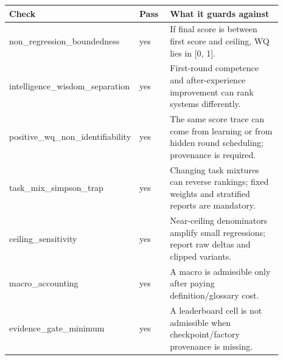 \begin{tabular}{p{0.27\linewidth}p{0.12\linewidth}p{0.50\linewidth}}
\toprule
Check & Pass & What it guards against \\
\midrule
non\_regression\_boundedness & yes & If final score is between first score and ceiling, WQ lies in [0, 1]. \\
intelligence\_wisdom\_separation & yes & First-round competence and after-experience improvement can rank systems differently. \\
positive\_wq\_non\_identifiability & yes & The same score trace can come from learning or from hidden round scheduling; provenance is required. \\
task\_mix\_simpson\_trap & yes & Changing task mixtures can reverse rankings; fixed weights and stratified reports are mandatory. \\
ceiling\_sensitivity & yes & Near-ceiling denominators amplify small regressions; report raw deltas and clipped variants. \\
macro\_accounting & yes & A macro is admissible only after paying definition/glossary cost. \\
evidence\_gate\_minimum & yes & A leaderboard cell is not admissible when checkpoint/factory provenance is missing. \\
\bottomrule
\end{tabular}
